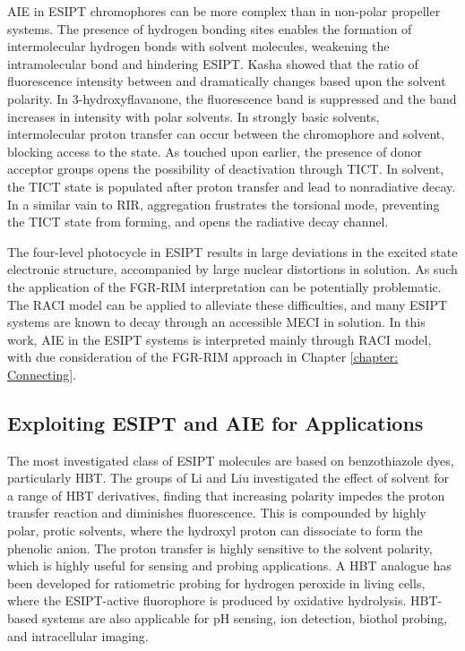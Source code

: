 \ac{AIE} in \ac{ESIPT} chromophores can be more complex than in non-polar propeller systems. The presence of hydrogen bonding sites enables the formation of intermolecular hydrogen bonds with solvent molecules, weakening the intramolecular bond and hindering \ac{ESIPT}.\cite{Cheng2015f} Kasha showed that the ratio of fluorescence intensity between \Estar and \Kstar dramatically changes based upon the solvent polarity.\cite{Kasha1986} In 3-hydroxyflavanone, the \Kstar fluorescence band is suppressed and the \Estar band increases in intensity with polar solvents. In strongly basic solvents, intermolecular proton transfer can occur between the chromophore and solvent, blocking access to the \Kstar state\cite{Laurent2014}. As touched upon earlier, the presence of donor acceptor groups opens the possibility of deactivation through \acf{TICT}. In solvent, the \ac{TICT} state is populated after proton transfer and lead to nonradiative decay. In a similar vain to \ac{RIR}, aggregation frustrates the torsional mode, preventing the \ac{TICT} state from forming, and opens the radiative decay channel.\cite{Park2017,Wu2015a}

The four-level photocycle in \ac{ESIPT} results in large deviations in the excited state electronic structure, accompanied by large nuclear distortions in solution. As such the application of the \ac{FGR-RIM} interpretation can be potentially problematic. The \ac{RACI} model can be applied to alleviate these difficulties, and many ESIPT systems are known to decay through an accessible \ac{MECI} in solution.\cite{Sobolewski2006,Sobolewski2006a,Barbatti2009,Park2009,Lochbrunner2001,Shigemitsu2012,Sporkel2013,Plasser2014,Baker2015,Ghosh2015,Park2017,Chen2018} In this work, AIE in the \ac{ESIPT} systems is interpreted mainly through \ac{RACI} model,  with due consideration of the \ac{FGR-RIM} approach in Chapter \ref{chapter: Connecting}.

\subsection{Exploiting ESIPT and AIE for Applications}
The most investigated class of \ac{ESIPT} molecules are based on benzothiazole dyes, particularly \ac{HBT}.\cite{Padalkar2015,Kwon2011} The groups of Li and Liu investigated the effect of solvent for a range of \ac{HBT} derivatives, finding that increasing polarity impedes the proton transfer reaction and diminishes fluorescence. This is compounded by highly polar, protic solvents, where the hydroxyl proton can dissociate to form the phenolic anion. The proton transfer is highly sensitive to the solvent polarity, which is highly useful for sensing and probing applications.\cite{Wang2009,Cheng2015f} A \ac{HBT} analogue has been developed for ratiometric probing for hydrogen peroxide in living cells, where the \ac{ESIPT}-active fluorophore is produced by oxidative hydrolysis.\cite{Tang2018a} \ac{HBT}-based systems are also applicable for pH sensing, ion detection, biothol probing, and intracellular imaging.\cite{Kachwal2018,Kachwal2018,Liu2018}

